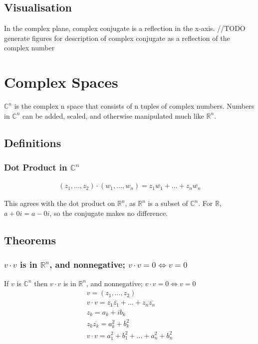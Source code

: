 	
	\subsection{Visualisation}
		
		In the complex plane, complex conjugate is a reflection in the x-axis.
		//TODO generate figures for description of complex conjugate as a reflection of the complex number
		
\section{Complex Spaces}

	$\mathbb{C}^n$ is the complex n space that consists of n tuples of complex numbers.
	Numbers in $\mathbb{C}^n$ can be added, scaled, and otherwise manipulated much like $\mathbb{R}^n$.
	
	\subsection{Definitions}
	 
	 	\subsubsection{Dot Product in $\mathbb{C}^n$}
	 	
		\begin{align}
			(z_1, \ldots, z_2) \cdot (w_1, \ldots, w_n) = z_1\overline{w_1} + \ldots + z_n\overline{w_n}
		\end{align}
		
		This agrees with the dot product on $\mathbb{R}^n$, as $\mathbb{R}^n$ is a subset of $\mathbb{C}^n$.  For $\mathbb{R}$, $a + 0i = a - 0i$, so the conjugate makes no difference.
		
	\subsection{Theorems}
	
		\subsubsection{$v \cdot v$ is in $\mathbb{R}^n$, and nonnegative; $v \cdot v = 0 \iff v = 0$}
		If $v$ is $\mathbb{C}^n$ then $v \cdot v$ is in $\mathbb{R}^n$, and nonnegative; $v \cdot v = 0 \iff v = 0$
				\begin{align}
					v = (z_1, \ldots, z_2) \\
					v \cdot v = z_1\overline{z_1} + \ldots + z_n\overline{z_n} \\
					z_k = a_k + ib_k \\
					z_k\overline{z_k} = a_k^2 + b_k^2 \\
					v \cdot v = a_1^2 + b_1^2 + \ldots + a_n^2 + b_n^2
				\end{align}
				

